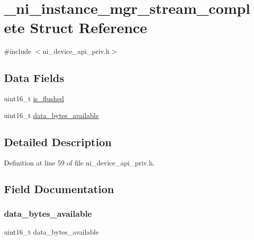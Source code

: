 \hypertarget{struct__ni__instance__mgr__stream__complete}{}\section{\+\_\+ni\+\_\+instance\+\_\+mgr\+\_\+stream\+\_\+complete Struct Reference}
\label{struct__ni__instance__mgr__stream__complete}


{\ttfamily \#include $<$ni\+\_\+device\+\_\+api\+\_\+priv.\+h$>$}

\subsection*{Data Fields}
\begin{DoxyCompactItemize}
\item 
uint16\+\_\+t \mbox{\hyperlink{struct__ni__instance__mgr__stream__complete_a53f8d848132d487dcb862de1e6ccbac7}{is\+\_\+flushed}}
\item 
uint16\+\_\+t \mbox{\hyperlink{struct__ni__instance__mgr__stream__complete_acc603df09899d8757fe8b69b43d31094}{data\+\_\+bytes\+\_\+available}}
\end{DoxyCompactItemize}


\subsection{Detailed Description}


Definition at line 59 of file ni\+\_\+device\+\_\+api\+\_\+priv.\+h.



\subsection{Field Documentation}
\mbox{\label{struct__ni__instance__mgr__stream__complete_acc603df09899d8757fe8b69b43d31094}} 
\subsubsection{\texorpdfstring{data\_bytes\_available}{data\_bytes\_available}}
{\footnotesize\ttfamily uint16\+\_\+t data\+\_\+bytes\+\_\+available}



